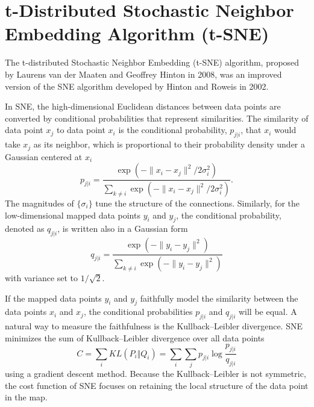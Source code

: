 \section{t-Distributed Stochastic Neighbor Embedding Algorithm (t-SNE)\label{Sec:DR:t-SNE}}
The t-distributed Stochastic Neighbor Embedding (t-SNE) algorithm, proposed by Laurens van der Maaten and Geoffrey Hinton in 2008,\cite{vandermaatenJMLR2008} was an improved version of the SNE algorithm developed by Hinton and Roweis in 2002.\cite{HintonNIPS2002}

In SNE, the high-dimensional Euclidean distances between data points are converted by conditional probabilities that represent similarities. The similarity of data point $x_j$ to data point $x_i$ is the conditional probability, $p_{j|i}$, that $x_i$ would take $x_j$ as its neighbor, which is proportional to their probability density under a Gaussian centered at $x_i$
\begin{equation}
	p_{j|i}=\frac{\exp{\left(-\lVert x_i-x_j\rVert^2/2\sigma_i^2\right)}}{\sum_{k\neq i}\exp{\left(-\lVert x_i-x_j\rVert^2/2\sigma_i^2\right)}}.
\end{equation}
The magnitudes of $\{\sigma_i\}$ tune the structure of the connections.
Similarly, for the low-dimensional mapped data points $y_i$ and $y_j$, the conditional probability, denoted as $q_{j|i}$, is written also in a Gaussian form
\begin{equation}
	q_{j|i}=\frac{\exp{\left(-\lVert y_i-y_j\rVert^2\right)}}{\sum_{k\neq i}\exp{\left(-\lVert y_i-y_j\rVert^2\right)}}
\end{equation}
with variance set to $1/\sqrt{2}$.

If the mapped data points $y_i$ and $y_j$ faithfully model the similarity between the data points $x_i$ and $x_j$, the conditional probabilities $p_{j|i}$ and $q_{j|i}$ will be equal. A natural way to measure the faithfulness is the Kullback--Leibler divergence. SNE minimizes the sum of Kullback--Leibler divergence over all data points
\begin{equation}
	C=\sum_i KL(P_i\Vert Q_i)=\sum_i \sum_j p_{j|i} \log{\frac{p_{j|i}}{q_{j|i}}}
\end{equation}
using a gradient descent method. Because the Kullback--Leibler is not symmetric, the cost function of SNE focuses on retaining the local structure of the data point in the map.

